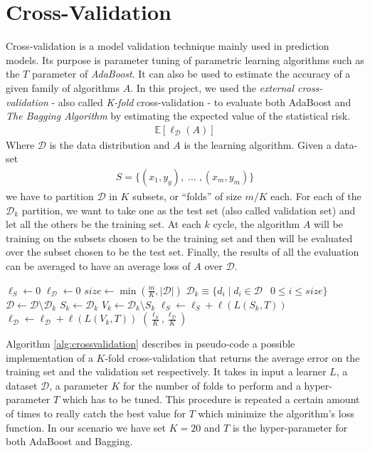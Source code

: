 
\chapter{Cross-Validation}
Cross-validation is a model validation technique mainly used in prediction models. Its purpose is parameter tuning of parametric learning algorithms such as the $T$ parameter of \textit{AdaBoost}. It can also be used to estimate the accuracy of a given family of algorithms $A$. In this project, we used the \textit{external cross-validation} - also called \textit{K-fold} cross-validation - to evaluate both AdaBoost and \textit{The Bagging Algorithm} by estimating the expected value of the statistical risk.
\begin{align*}
	\mathbb{E}[\ell_{\mathcal{D}}(A)]
\end{align*}
Where $\mathcal{D}$ is the data distribution and $A$ is the learning algorithm. Given a data-set
\begin{align*}
	S = \lbrace (x_{1},y_{y}),\;\dots\;,(x_{m},y_{m}) \rbrace
\end{align*}
we have to partition $\mathcal{D}$ in $K$ subsets, or ``folds'' of size $m/K$ each. For each of the $\mathcal{D}_{k}$ partition, we want to take one as the test set (also called validation set) and let all the others be the training set. At each $k$ cycle, the algorithm $A$ will be training on the subsets chosen to be the training set and then will be evaluated over the subset chosen to be the test set. Finally, the results of all the evaluation can be averaged to have an average loss of $A$ over $\mathcal{D}$.

\begin{algorithm}[]
	\caption{}
	\label{alg:crossvalidation}
	\begin{algorithmic}[1]
		\State $\ell_{S} \gets 0$
		\State $\ell_{\mathcal{D}} \gets 0$
			\State $size \gets \min(\frac{m}{K}, |\mathcal{D}|)$
			\State $\mathcal{D}_{k} \equiv \lbrace d_{i} \;|\; d_{i} \in \mathcal{D} \:\;\;0 \leq i \leq size\rbrace$
			\State $\mathcal{D} \gets \mathcal{D}\setminus\mathcal{D}_{k}$
		\EndFor
			\State $S_{k} \gets \mathcal{D}_{k}$
			\State $V_{k} \gets \mathcal{D}_{k}\setminus S_{k}$
			\State $\ell_{S} \gets \ell_{S} + \ell(L(S_{k}, T))$
			\State $\ell_{\mathcal{D}} \gets \ell_{\mathcal{D}} + \ell(L(V_{k}, T)) $
		\EndFor
		\Return $(\frac{\ell_{S}}{K},\frac{\ell_{\mathcal{D}}}{K})$
		\EndProcedure
	\end{algorithmic}
\end{algorithm}

Algorithm \ref{alg:crossvalidation} describes in pseudo-code a possible implementation of a $K$-fold cross-validation that returns the average error on the training set and the validation set respectively. It takes in input a learner $L$, a dataset $\mathcal{D}$, a parameter $K$ for the number of folds to perform and a hyper-parameter $T$ which has to be tuned. This procedure is repeated a certain amount of times to really catch the best value for $T$ which minimize the algorithm's loss function. In our scenario we have set $K=20$ and $T$ is the hyper-parameter for both AdaBoost and Bagging.